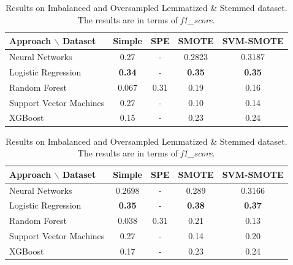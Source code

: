 \documentclass[11pt]{article}
\begin{document}
\begin{table}\small
	\centering
	\begin{subtable}{1\textwidth}
		\centering
		\begin{tabular}{lcccc}
			\hline \textbf{Approach $\backslash$ Dataset} & Simple        & SPE  & SMOTE         & SVM-SMOTE     \\ \hline
			Neural Networks                               & 0.27          & -    & 0.2823        & 0.3187        \\
			Logistic Regression                           & \textbf{0.34} & -    & \textbf{0.35} & \textbf{0.35} \\
			Random Forest                                 & 0.067         & 0.31 & 0.19          & 0.16          \\
			Support Vector Machines                       & 0.27          & -    & 0.10          & 0.14          \\
			XGBoost                                       & 0.15          & -    & 0.23          & 0.24          \\
			\hline
		\end{tabular}
		\caption{Results on Imbalanced and Oversampled Lemmatized dataset}
	\end{subtable}
	\bigskip
	\begin{subtable}{1\textwidth}
		\centering
		\begin{tabular}{lcccc}
			\hline \textbf{Approach $\backslash$ Dataset} & Simple        & SPE  & SMOTE         & SVM-SMOTE     \\ \hline
			Neural Networks                               & 0.2698        & -    & 0.289         & 0.3166        \\
			Logistic Regression                           & \textbf{0.35} & -    & \textbf{0.38} & \textbf{0.37} \\
			Random Forest                                 & 0.038         & 0.31 & 0.21          & 0.13          \\
			Support Vector Machines                       & 0.27          & -    & 0.14          & 0.20          \\
			XGBoost                                       & 0.17          & -    & 0.23          & 0.24          \\
			\hline
		\end{tabular}
		\caption{Results on Imbalanced and Oversampled Stemmed dataset}
	\end{subtable}
	\caption{ Results on Imbalanced and Oversampled Lemmatized \& Stemmed dataset. The results are in terms of \textit{f1\_score}. }
	\label{table1}
\end{table}
\end{document}
